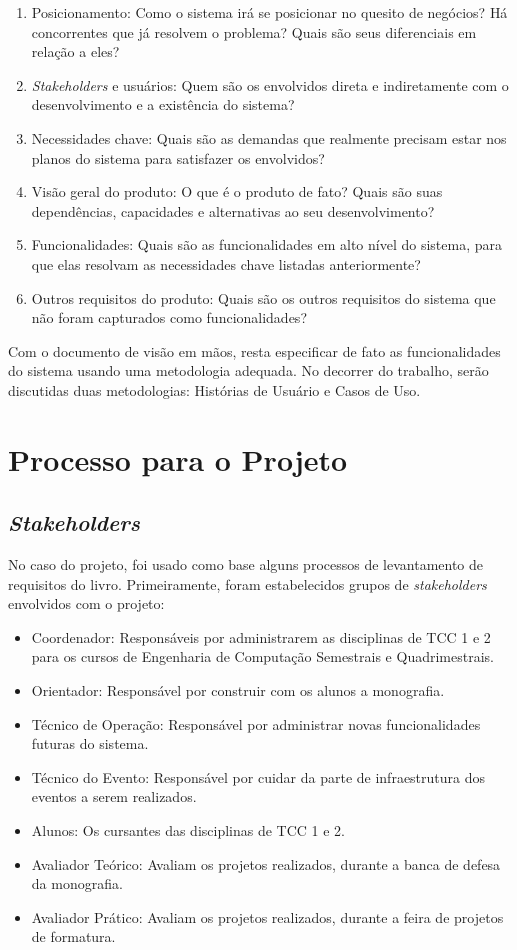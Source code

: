 \begin{enumerate}
    \item Posicionamento: Como o sistema irá se posicionar no quesito de negócios? Há concorrentes que já resolvem o problema? Quais são seus diferenciais em relação a eles?
    \item \textit{Stakeholders} e usuários: Quem são os envolvidos direta e indiretamente com o desenvolvimento e a existência do sistema?
    \item Necessidades chave: Quais são as demandas que realmente precisam estar nos planos do sistema para satisfazer os envolvidos?
    \item Visão geral do produto: O que é o produto de fato? Quais são suas dependências, capacidades e alternativas ao seu desenvolvimento?
    \item Funcionalidades: Quais são as funcionalidades em alto nível do sistema, para que elas resolvam as necessidades chave listadas anteriormente?
    \item Outros requisitos do produto: Quais são os outros requisitos do sistema que não foram capturados como funcionalidades?
\end{enumerate}

Com o documento de visão em mãos, resta especificar de fato as funcionalidades do sistema usando uma metodologia adequada. No decorrer do trabalho, serão discutidas duas metodologias: Histórias de Usuário e Casos de Uso.

\section{Processo para o Projeto}

\subsection{\textit{Stakeholders}}

No caso do projeto, foi usado como base alguns processos de levantamento de requisitos do livro\cite{kurtbittnerianspence2002}.
Primeiramente, foram estabelecidos grupos de \textit{stakeholders} envolvidos com o projeto:

\begin{itemize}
    \item Coordenador: Responsáveis por administrarem as disciplinas de TCC 1 e 2 para os cursos de Engenharia de Computação Semestrais e Quadrimestrais.
    \item Orientador: Responsável por construir com os alunos a monografia.
    \item Técnico de Operação: Responsável por administrar novas funcionalidades futuras do sistema.
    \item Técnico do Evento: Responsável por cuidar da parte de infraestrutura dos eventos a serem realizados.
    \item Alunos: Os cursantes das disciplinas de TCC 1 e 2.
    \item Avaliador Teórico: Avaliam os projetos realizados, durante a banca de defesa da monografia.
    \item Avaliador Prático: Avaliam os projetos realizados, durante a feira de projetos de formatura.
\end{itemize}

